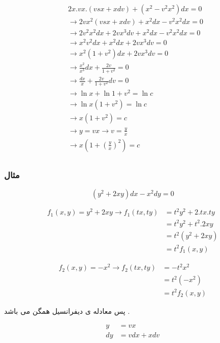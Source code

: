 \documentclass[12pt]{book}
\begin{document}
\begin{align*}
&2x.vx.(vsx + xdv) + (x^{2} - v^{2}x^{2})dx = 0 \\
&\to 2vx^{2} (vsx + xdv) + x^{2}dx - v^{2}x^{2}dx = 0 \\
&\to 2v^{2}x^{2}dx + 2vx^{3}dv + x^{2}dx - v^{2}x^{2}dx = 0 \\
&\to x^{2}v^{2}dx + x^{2}dx + 2vx^{3}dv = 0 \\
&\to x^{2}(1 + v^{2})dx + 2vx^{3}dv = 0 \\
&\to \frac{x^{2}}{x^{3}} dx + \frac{2v}{1+v^{2}} = 0 \\
&\to \frac{dx}{x} + \frac{2v}{1+v^{2}}dv = 0 \\
&\to \ln{x} + \ln{1+v^{2}} = \ln{c} \\
&\to \ln{x(1 + v^{2})} = \ln{c} \\
&\to x(1 + v^{2}) = c \\ 
&\to y = vx \to v = \frac{y}{x} \\
&\to x\left( 1 + (\frac{y}{x})^{2} \right) = c \\
\end{align*}


\subsubsection{مثال}


$$
(y^{2} + 2xy)dx - x^{2}dy = 0
$$

\begin{align*}
f_{1}(x,y) = y^{2} + 2xy \to f_{1}(tx,ty) &= t^{2}y^{2} + 2.tx.ty \\
&= t^{2}y^{2} + t^{2}.2xy \\
&= t^{2}( y^{2} + 2xy ) \\
&= t^{2} f_{1}(x,y)
\end{align*}

\begin{align*}
f_{2}(x,y) = - x^{2} \to f_{2}(tx,ty) &= - t^{2} x^{2} \\
&= t^{2} ( - x^{2} ) \\
&= t^{2} f_{2}(x,y)
\end{align*}

پس معادله ی دیفرانسیل همگن می باشد .

\begin{align*}
y &= vx \\
dy &= vdx + xdv \\
\end{align*}
\end{document}
